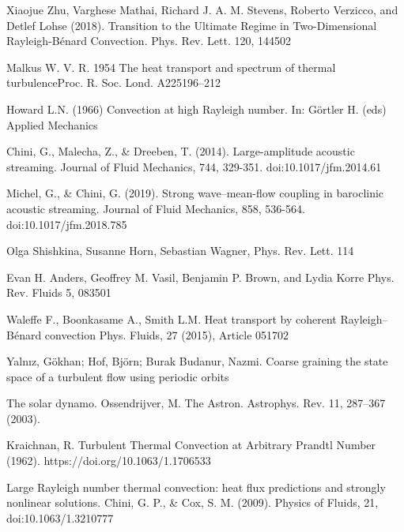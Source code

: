 \documentclass[reprint,amsmath,amssymb,aps]{revtex4-1}
\begin{document}
% 
\begin{thebibliography}{99} 

 Xiaojue Zhu, Varghese Mathai, Richard J. A. M. Stevens, Roberto Verzicco, and Detlef Lohse (2018). Transition to the Ultimate Regime in Two-Dimensional Rayleigh-Bénard Convection. Phys. Rev. Lett. 120, 144502

 Malkus W. V. R. 1954 The heat transport and spectrum of thermal turbulenceProc. R. Soc. Lond. A225196–212

 Howard L.N. (1966) Convection at high Rayleigh number. In: Görtler H. (eds) Applied Mechanics

 Chini, G., Malecha, Z., \& Dreeben, T. (2014). Large-amplitude acoustic streaming. Journal of Fluid Mechanics, 744, 329-351. doi:10.1017/jfm.2014.61

 Michel, G., \& Chini, G. (2019). Strong wave–mean-flow coupling in baroclinic acoustic streaming. Journal of Fluid Mechanics, 858, 536-564. doi:10.1017/jfm.2018.785

 Olga Shishkina, Susanne Horn, Sebastian Wagner, Phys. Rev. Lett. 114

 Evan H. Anders, Geoffrey M. Vasil, Benjamin P. Brown, and Lydia Korre Phys. Rev. Fluids 5, 083501

 Waleffe F., Boonkasame A., Smith L.M. Heat transport by coherent Rayleigh–Bénard convection Phys. Fluids, 27 (2015), Article 051702

 Yalnız, Gökhan; Hof, Björn; Burak Budanur, Nazmi. Coarse graining the state space of a turbulent flow using periodic orbits 

 The solar dynamo. Ossendrijver, M. The Astron. Astrophys. Rev. 11, 287–367 (2003).

 Kraichnan, R. Turbulent Thermal Convection at Arbitrary Prandtl Number (1962). https://doi.org/10.1063/1.1706533



 Large Rayleigh number thermal convection: heat flux predictions and strongly nonlinear solutions. Chini, G. P., \& Cox, S. M. (2009). Physics of Fluids, 21, doi:10.1063/1.3210777


\end{thebibliography}
\end{document}
